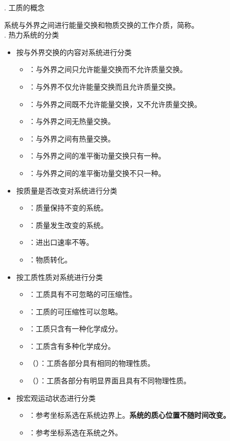 . \hspace*{0.3em} 工质的概念

系统与外界之间进行能量交换和物质交换的工作介质，简称。
\\

. \hspace*{0.3em} 热力系统的分类

\begin{itemize}
	\item 按与外界交换的内容对系统进行分类
	\begin{itemize}
		\item {}：与外界之间只允许能量交换而不允许质量交换。
		\item {}：与外界不仅允许能量交换而且允许质量交换。
		\item {}：与外界之间既不允许能量交换，又不允许质量交换。
		\item {}：与外界之间无热量交换。
		\item {}：与外界之间有热量交换。
		\item {}：与外界之间的准平衡功量交换只有一种。
		\item {}：与外界之间的准平衡功量交换不只一种。
	\end{itemize}
	\item 按质量是否改变对系统进行分类
	\begin{itemize}
		\item {}：质量保持不变的系统。
		\item {}：质量发生改变的系统。
		\item {}：进出口速率不等。
		\item {}：物质转化。
	\end{itemize}
	\item 按工质性质对系统进行分类
	\begin{itemize}
		\item {}：工质具有不可忽略的可压缩性。
		\item {}：工质的可压缩性可以忽略。
		\item {}：工质只含有一种化学成分。
		\item {}：工质含有多种化学成分。
		\item {}（）：工质各部分具有相同的物理性质。
		\item {}（）：工质各部分有明显界面且具有不同物理性质。
	\end{itemize}
	\item 按宏观运动状态进行分类
	\begin{itemize}
		\item {}：参考坐标系选在系统边界上。\textbf{系统的质心位置不随时间改变。}
		\item {}：参考坐标系选在系统之外。
	\end{itemize}
\end{itemize}

